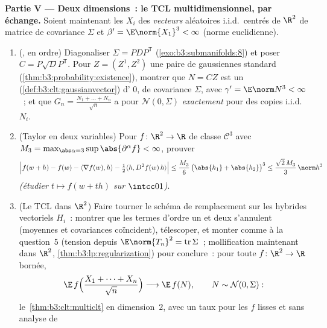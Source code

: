\begin{problem}
\medskip
\noindent\textbf{Partie V --- Deux dimensions~: le TCL
multidimensionnel, par échange.} Soient maintenant les
$X_i$ des \emph{vecteurs} aléatoires i.i.d.\ centrés de
$\R^2$ de matrice de covariance $\Sigma$ et $\beta' =
\E\norm{X_1}^3 < \infty$ (norme euclidienne).
\begin{enumerate}[resume]
  \item (, en ordre) Diagonaliser $\Sigma
        = PDP^{\mathsf T}$ (\cref{exo:b3:submanifolds:8}) et
        poser $C = P\sqrt DP^{\mathsf T}$. Pour $Z = (Z^1,
        Z^2)$ une paire de gaussiennes standard
         (\cref{thm:b3:probability:existence}),
        montrer que $N = CZ$ est un 
        (\cref{def:b3:clt:gaussianvector}) d' $0$,
        de covariance $\Sigma$, avec $\gamma' = \E\norm N^3
        < \infty$~; et que $G_n = \frac{N_1 + \dots +
        N_n}{\sqrt n}$ a pour  $\mathcal N(0, \Sigma)$
        \emph{exactement} pour des copies i.i.d.\ $N_i$.
  \item (Taylor en deux variables) Pour $f \colon \R^2 \to
        \R$ de classe $\mathcal C^3$ avec $M_3 =
        \max_{\abs\alpha = 3}\sup\abs{\partial^\alpha f} <
        \infty$, prouver
        \[
        \Bigl|f(w + h) - f(w) - \langle\nabla f(w),
        h\rangle - \tfrac12\langle h, D^2f(w)\,h\rangle
        \Bigr| \leq \frac{M_3}6\,\bigl(\abs{h_1} +
        \abs{h_2}\bigr)^3 \leq \frac{\sqrt2\,M_3}3\,
        \norm h^3
        \]
        \emph{(étudier $t \mapsto f(w + th)$ sur
        $\intcc01$)}.
  \item (Le TCL dans $\R^2$) Faire tourner le schéma de
        remplacement sur les hybrides vectoriels $H_i$~:
        montrer que les termes d'ordre un et deux
        s'annulent (moyennes et covariances coïncident),
        télescoper, et monter comme à la question~5 (tension
        depuis $\E\norm{T_n}^2 = \operatorname{tr}\Sigma$~;
        mollification maintenant dans $\R^2$,
        \cref{thm:b3:lp:regularization}) pour conclure~:
        pour toute $f \colon \R^2 \to \R$  bornée,
        \[
        \E\,f\Bigl(\frac{X_1 + \dots + X_n}{\sqrt n}\Bigr)
        \longrightarrow \E\,f(N), \qquad N \sim \mathcal
        N(0, \Sigma) :
        \]
        le~\cref{thm:b3:clt:multiclt} en dimension~$2$, avec
        un taux pour les $f$ lisses et sans analyse de

\end{enumerate}
\end{problem}
